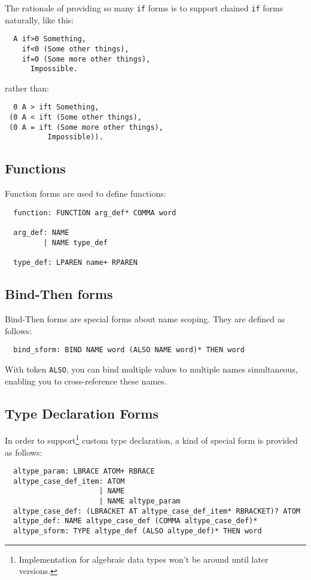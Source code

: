 \documentclass{article}
\begin{document}
The rationale of providing so many \texttt{if} forms is to support chained \texttt{if} forms naturally, like this:
\begin{verbatim}
  A if>0 Something,
    if<0 (Some other things),
    if=0 (Some more other things),
      Impossible.
\end{verbatim}

rather than:
\begin{verbatim}
  0 A > ift Something,
 (0 A < ift (Some other things),
 (0 A = ift (Some more other things),
          Impossible)).
\end{verbatim}

\subsection{Functions}

Function forms are used to define functions:
\begin{verbatim}
  function: FUNCTION arg_def* COMMA word

  arg_def: NAME
         | NAME type_def

  type_def: LPAREN name+ RPAREN
\end{verbatim}

\subsection{Bind-Then forms}

Bind-Then forms are special forms about name scoping. They are defined as follows:
\begin{verbatim}
  bind_sform: BIND NAME word (ALSO NAME word)* THEN word
\end{verbatim}

With token \texttt{ALSO}, you can bind multiple values to multiple names simultaneous, enabling you to cross-reference these names.

\subsection{Type Declaration Forms}\label{ssec:tdsf}

In order to support\footnote{Implementation for algebraic data types won't be around until later versions.} custom type declaration, a kind of special form is provided as follows:
\begin{verbatim}
  altype_param: LBRACE ATOM+ RBRACE
  altype_case_def_item: ATOM
                      | NAME
                      | NAME altype_param
  altype_case_def: (LBRACKET AT altype_case_def_item* RBRACKET)? ATOM
  altype_def: NAME altype_case_def (COMMA altype_case_def)*
  altype_sform: TYPE altype_def (ALSO altype_def)* THEN word
\end{verbatim}
\end{document}
